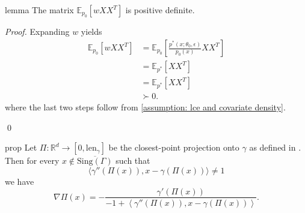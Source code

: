 \documentclass[11pt]{article}
\begin{document}
\begin{restatable}{lemma}{} \label{lemma: pd}
    The matrix $\mathbb{E}_{p_0}[wXX^T]$ is positive definite.
\end{restatable}
\noindent \textit{Proof.} Expanding $w$ yields
\begin{align}
    \mathbb{E}_{p_0}[wXX^T] &= \mathbb{E}_{p_0}\left[\frac{p^*(x; \theta_0, \epsilon)}{p_0(x)}XX^T\right] \\
    &= \mathbb{E}_{p^*}\left[XX^T\right] \\
    &= \mathbb{E}_{p^*}\left[XX^T\right]  \\
    &\succ 0.
\end{align}
where the last two steps follow from \cref{assumption: lce and covariate density}.

\qed{}

\begin{restatable}{prop}{} \label{prop: proj gradient}
    Let $\Pi: \mathbb{R}^d \rightarrow [0, \text{len}_{\gamma}]$ be the closest-point projection onto $\gamma$ as defined in . Then for every $x \notin \overline{\text{Sing}(\Gamma)}$ such that 
    \[\langle\gamma''(\Pi(x)), x - \gamma(\Pi(x))\rangle \neq 1\]
    we have 
    \[\nabla\Pi(x)  = -\frac{\gamma'(\Pi(x))}{-1 + \left\langle\gamma''(\Pi(x)), x - \gamma(\Pi(x))\right\rangle}.\]
\end{restatable}
\end{document}
